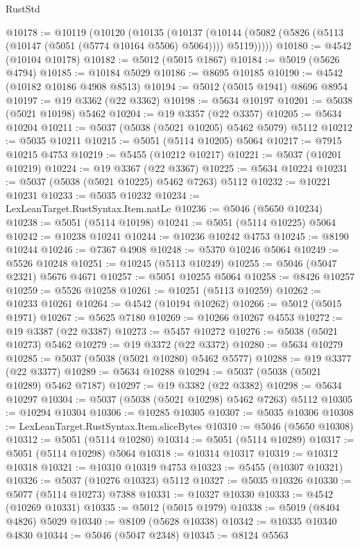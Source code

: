 \begin{lexlean}{RustStd}
\begin{coremodule}
@10178 := @10119
    (@10120
      (@10135
        (@10137
          (@10144 (@5082 (@5826 (@5113 (@10147 (@5051 (@5774 @10164 @5506) @5064)))) @5119)))))
@10180 := @4542 (@10104 @10178)
@10182 := @5012 (@5015 @1867)
@10184 := @5019 (@5626 @4794)
@10185 := @10184 @5029
@10186 := @8695 @10185
@10190 := @4542 (@10182 @10186 @4908 @8513)
@10194 := @5012 (@5015 @1941) @8696 @8954
@10197 := @19 @3362 (@22 @3362)
@10198 := @5634 @10197
@10201 := @5038 (@5021 @10198) @5462
@10204 := @19 @3357 (@22 @3357)
@10205 := @5634 @10204
@10211 := @5037 (@5038 (@5021 @10205) @5462 @5079) @5112
@10212 := @5035 @10211
@10215 := @5051 (@5114 @10205) @5064
@10217 := @7915 @10215 @4753
@10219 := @5455 (@10212 @10217)
@10221 := @5037 (@10201 @10219)
@10224 := @19 @3367 (@22 @3367)
@10225 := @5634 @10224
@10231 := @5037 (@5038 (@5021 @10225) @5462 @7263) @5112
@10232 := @10221 @10231
@10233 := @5035 @10232
@10234 := LexLeanTarget.RustSyntax.Item.natLe
@10236 := @5046 (@5650 @10234)
@10238 := @5051 (@5114 @10198)
@10241 := @5051 (@5114 @10225) @5064
@10242 := @10238 @10241
@10244 := @10236 @10242 @4753
@10245 := @8190 @10244
@10246 := @7367 @4908
@10248 := @5370 @10246 @5064
@10249 := @5526 @10248
@10251 := @10245 (@5113 @10249)
@10255 := @5046 (@5047 @2321) @5676 @4671
@10257 := @5051 @10255 @5064
@10258 := @8426 @10257
@10259 := @5526 @10258
@10261 := @10251 (@5113 @10259)
@10262 := @10233 @10261
@10264 := @4542 (@10194 @10262)
@10266 := @5012 (@5015 @1971)
@10267 := @5625 @7180
@10269 := @10266 @10267 @4553
@10272 := @19 @3387 (@22 @3387)
@10273 := @5457 @10272
@10276 := @5038 (@5021 @10273) @5462
@10279 := @19 @3372 (@22 @3372)
@10280 := @5634 @10279
@10285 := @5037 (@5038 (@5021 @10280) @5462 @5577)
@10288 := @19 @3377 (@22 @3377)
@10289 := @5634 @10288
@10294 := @5037 (@5038 (@5021 @10289) @5462 @7187)
@10297 := @19 @3382 (@22 @3382)
@10298 := @5634 @10297
@10304 := @5037 (@5038 (@5021 @10298) @5462 @7263) @5112
@10305 := @10294 @10304
@10306 := @10285 @10305
@10307 := @5035 @10306
@10308 := LexLeanTarget.RustSyntax.Item.sliceBytes
@10310 := @5046 (@5650 @10308)
@10312 := @5051 (@5114 @10280)
@10314 := @5051 (@5114 @10289)
@10317 := @5051 (@5114 @10298) @5064
@10318 := @10314 @10317
@10319 := @10312 @10318
@10321 := @10310 @10319 @4753
@10323 := @5455 (@10307 @10321)
@10326 := @5037 (@10276 @10323) @5112
@10327 := @5035 @10326
@10330 := @5077 (@5114 @10273) @7388
@10331 := @10327 @10330
@10333 := @4542 (@10269 @10331)
@10335 := @5012 (@5015 @1979)
@10338 := @5019 (@8404 @4826) @5029
@10340 := @8109 (@5628 @10338)
@10342 := @10335 @10340 @4830
@10344 := @5046 (@5047 @2348)
@10345 := @8124 @5563

\end{coremodule}
\end{lexlean}
